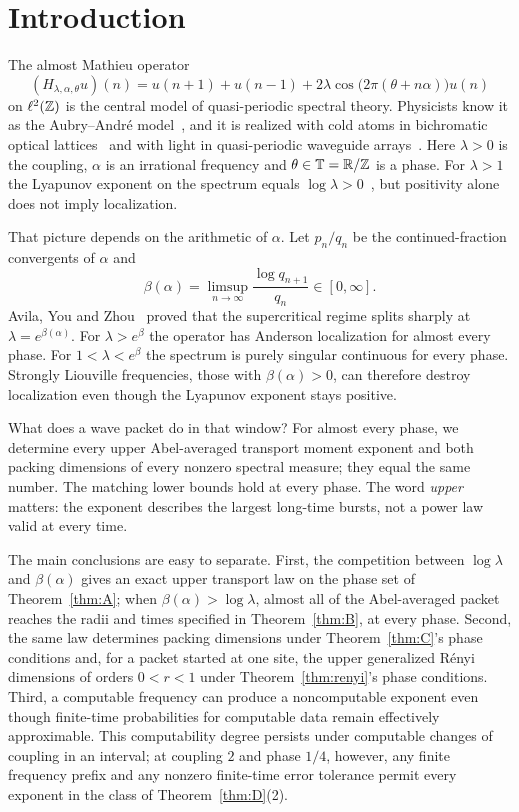 \section{Introduction}\label{sec:intro}

The almost Mathieu operator
\begin{equation}\label{eq:amo}
(H_{\lambda,\alpha,\theta}u)(n)=u(n+1)+u(n-1)+2\lambda\cos\bigl(2\pi(\theta+n\alpha)\bigr)u(n)
\end{equation}
on $\ell^2(\mathbb Z)$ is the central model of quasi-periodic spectral theory. Physicists know it as the Aubry--Andr\'e model~\cite{AubryAndre1980}, and it is realized with cold atoms in bichromatic optical lattices~\cite{Roati2008} and with light in quasi-periodic waveguide arrays~\cite{Lahini2009}. Here $\lambda>0$ is the coupling, $\alpha$ is an irrational frequency and $\theta\in\mathbb T=\mathbb R/\mathbb Z$ is a phase. For $\lambda>1$ the Lyapunov exponent on the spectrum equals $\log\lambda>0$~\cite{BourgainJitomirskaya2002}, but positivity alone does not imply localization.

That picture depends on the arithmetic of $\alpha$. Let $p_n/q_n$ be the continued-fraction convergents of $\alpha$ and
\begin{equation}\label{eq:beta}
\beta(\alpha)=\limsup_{n\to\infty}\frac{\log q_{n+1}}{q_n}\in[0,\infty].
\end{equation}
Avila, You and Zhou~\cite{AYZ2017} proved that the supercritical regime splits sharply at $\lambda=e^{\beta(\alpha)}$. For $\lambda>e^{\beta}$ the operator has Anderson localization for almost every phase. For $1<\lambda<e^{\beta}$ the spectrum is purely singular continuous for every phase. Strongly Liouville frequencies, those with $\beta(\alpha)>0$, can therefore destroy localization even though the Lyapunov exponent stays positive.

What does a wave packet do in that window? For almost every phase, we determine every upper Abel-averaged transport moment exponent and both packing dimensions of every nonzero spectral measure; they equal the same number. The matching lower bounds hold at every phase. The word \emph{upper} matters: the exponent describes the largest long-time bursts, not a power law valid at every time.

The main conclusions are easy to separate. First, the competition between $\log\lambda$ and $\beta(\alpha)$ gives an exact upper transport law on the phase set of Theorem~\ref{thm:A}; when $\beta(\alpha)>\log\lambda$, almost all of the Abel-averaged packet reaches the radii and times specified in Theorem~\ref{thm:B}, at every phase. Second, the same law determines packing dimensions under Theorem~\ref{thm:C}'s phase conditions and, for a packet started at one site, the upper generalized R\'enyi dimensions of orders $0<r<1$ under Theorem~\ref{thm:renyi}'s phase conditions. Third, a computable frequency can produce a noncomputable exponent even though finite-time probabilities for computable data remain effectively approximable. This computability degree persists under computable changes of coupling in an interval; at coupling $2$ and phase $1/4$, however, any finite frequency prefix and any nonzero finite-time error tolerance permit every exponent in the class of Theorem~\ref{thm:D}(2).

